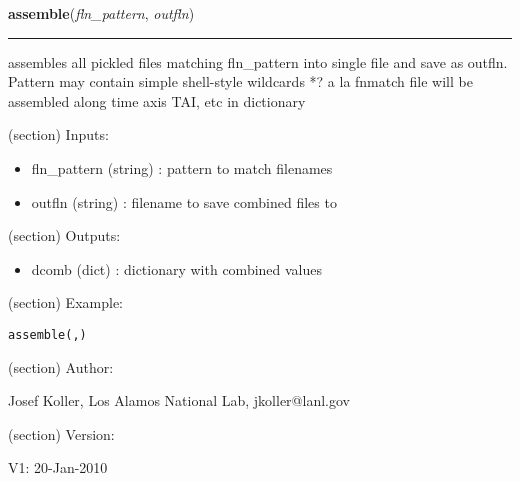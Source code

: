 \hspace{.8\funcindent}\begin{boxedminipage}{\funcwidth}

    \raggedright \textbf{assemble}(\textit{fln\_pattern}, \textit{outfln})

    \vspace{-1.5ex}

    \rule{\textwidth}{0.5\fboxrule}
\setlength{\parskip}{2ex}
    assembles all pickled files matching fln\_pattern into single file and 
    save as outfln. Pattern may contain simple shell-style wildcards *? a 
    la fnmatch file will be assembled along time axis TAI, etc in 
    dictionary

    (section) Inputs:

      \begin{itemize}
      \setlength{\parskip}{0.6ex}
        \item fln\_pattern (string) : pattern to match filenames

        \item outfln (string) : filename to save combined files to

      \end{itemize}

    (section) Outputs:

      \begin{itemize}
      \setlength{\parskip}{0.6ex}
        \item dcomb (dict) : dictionary with combined values

      \end{itemize}

    (section) Example:

\begin{alltt}
\pysrcprompt{{\textgreater}{\textgreater}{\textgreater} }assemble(, )
\end{alltt}
    (section) Author:

      Josef Koller, Los Alamos National Lab, jkoller@lanl.gov

    (section) Version:

      V1: 20-Jan-2010

\setlength{\parskip}{1ex}
    \end{boxedminipage}

